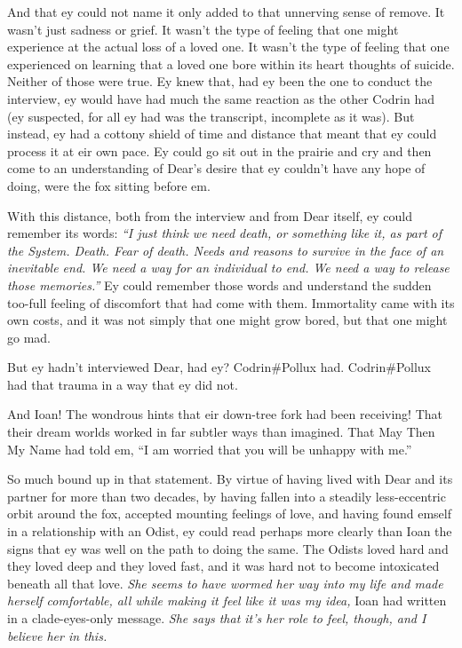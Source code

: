 And that ey could not name it only added to that unnerving sense of remove. It wasn't just sadness or grief. It wasn't the type of feeling that one might experience at the actual loss of a loved one. It wasn't the type of feeling that one experienced on learning that a loved one bore within its heart thoughts of suicide. Neither of those were true. Ey knew that, had ey been the one to conduct the interview, ey would have had much the same reaction as the other Codrin had (ey suspected, for all ey had was the transcript, incomplete as it was). But instead, ey had a cottony shield of time and distance that meant that ey could process it at eir own pace. Ey could go sit out in the prairie and cry and then come to an understanding of Dear's desire that ey couldn't have any hope of doing, were the fox sitting before em.

With this distance, both from the interview and from Dear itself, ey could remember its words: \emph{``I just think we need death, or something like it, as part of the System. Death. Fear of death. Needs and reasons to survive in the face of an inevitable end. We need a way for an individual to end. We need a way to release those memories.''} Ey could remember those words and understand the sudden too-full feeling of discomfort that had come with them. Immortality came with its own costs, and it was not simply that one might grow bored, but that one might go mad.

But ey hadn't interviewed Dear, had ey? Codrin\#Pollux had. Codrin\#Pollux had that trauma in a way that ey did not.

And Ioan! The wondrous hints that eir down-tree fork had been receiving! That their dream worlds worked in far subtler ways than imagined. That May Then My Name had told em, ``I am worried that you will be unhappy with me.''

So much bound up in that statement. By virtue of having lived with Dear and its partner for more than two decades, by having fallen into a steadily less-eccentric orbit around the fox, accepted mounting feelings of love, and having found emself in a relationship with an Odist, ey could read perhaps more clearly than Ioan the signs that ey was well on the path to doing the same. The Odists loved hard and they loved deep and they loved fast, and it was hard not to become intoxicated beneath all that love. \emph{She seems to have wormed her way into my life and made herself comfortable, all while making it feel like it was my idea,} Ioan had written in a clade-eyes-only message. \emph{She says that it's her role to feel, though, and I believe her in this.}

